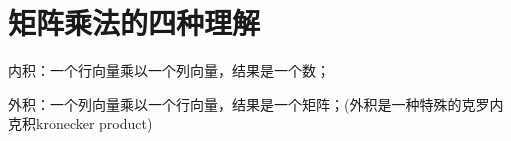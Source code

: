 \section{矩阵乘法的四种理解}
内积：一个行向量乘以一个列向量，结果是一个数；

外积：一个列向量乘以一个行向量，结果是一个矩阵；(外积是一种特殊的克罗内克积kronecker product)